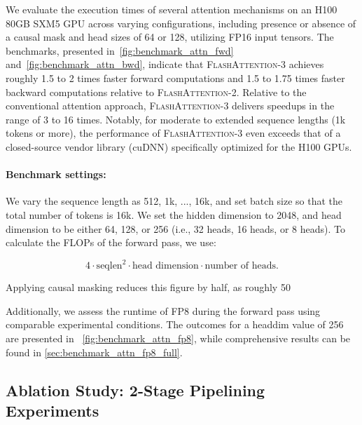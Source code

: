 \begin{enumerate}
We evaluate the execution times of several attention mechanisms on an H100 80GB SXM5 GPU across varying configurations, including presence or absence of a causal mask and head sizes of 64 or 128, utilizing FP16 input tensors. The benchmarks, presented in~\cref{fig:benchmark_attn_fwd} and~\cref{fig:benchmark_attn_bwd}, indicate that \textsc{FlashAttention-3} achieves roughly 1.5 to 2 times faster forward computations and 1.5 to 1.75 times faster backward computations relative to \textsc{FlashAttention-2}. Relative to the conventional attention approach, \textsc{FlashAttention-3} delivers speedups in the range of 3 to 16 times. Notably, for moderate to extended sequence lengths (1k tokens or more), the performance of \textsc{FlashAttention-3} even exceeds that of a closed-source vendor library (cuDNN) specifically optimized for the H100 GPUs.

\paragraph{Benchmark settings:} We vary the sequence length as 512, 1k, ..., 16k, and set batch size so that the total number of tokens is 16k. We set the hidden dimension to 2048, and head dimension to be either 64, 128, or 256 (i.e., 32 heads, 16 heads, or 8 heads). To calculate the FLOPs of the forward pass, we use:

\begin{equation*}
  4 \cdot \text{seqlen}^2 \cdot \text{head dimension} \cdot \text{number of heads}.
\end{equation*}

Applying causal masking reduces this figure by half, as roughly 50%

Additionally, we assess the runtime of FP8 during the forward pass using comparable experimental conditions. The outcomes for a headdim value of 256 are presented in ~\cref{fig:benchmark_attn_fp8}, while comprehensive results can be found in \cref{sec:benchmark_attn_fp8_full}.

\subsection{Ablation Study: 2-Stage Pipelining Experiments}
\label{sec:2-stage-pipelining-experiments}


\end{enumerate}
